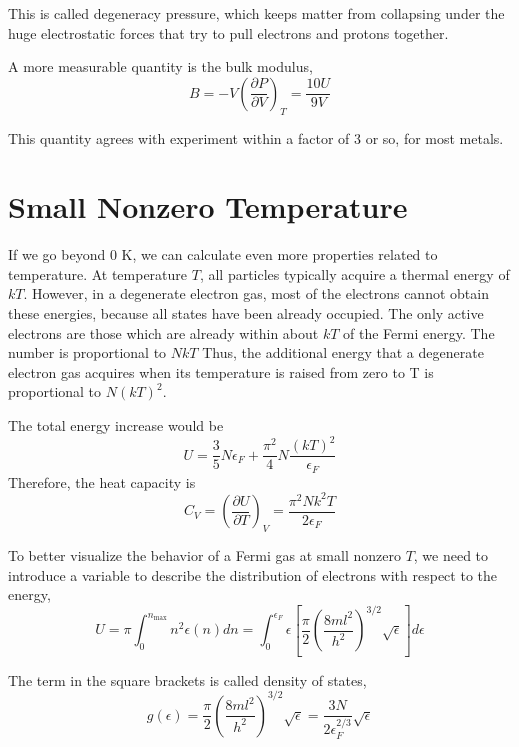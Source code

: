 This is called degeneracy pressure, which keeps matter from collapsing under the huge electrostatic forces that try to pull electrons and protons together.

A more measurable quantity is the bulk modulus,
\begin{equation}
B = -V (\frac{\partial P}{\partial V})_T = \frac{10U}{9V} 
\end{equation}

This quantity agrees with experiment within a factor of 3 or so, for most metals.

\section{Small Nonzero Temperature}
If we go beyond 0 K, we can calculate even more properties related to temperature. At temperature $T$, all particles typically acquire a thermal energy of $kT$.
However, in a degenerate electron gas, most of the electrons cannot obtain these energies, because all states have been already occupied. 
The only active electrons are those which are already within about $kT$ of the Fermi energy. The number is proportional to $NkT$
Thus, the additional energy that a degenerate electron gas acquires when its temperature is raised from zero to T is proportional to $N(kT)^2$.

The total energy increase would be 
\begin{equation}
 U = \frac{3}{5} N \epsilon_{F} + \frac{\pi^2}{4} N \frac{(kT)^2}{\epsilon_{F}}
\end{equation}
Therefore, the heat capacity is
\begin{equation}
C_V = (\frac{\partial U}{\partial T})_V = \frac{\pi^2Nk^2T}{2\epsilon_F}
\end{equation}

To better visualize the behavior of a Fermi gas at small nonzero $T$, we need to introduce a variable to describe the distribution of electrons with respect to the energy,
\begin{equation}
U = \pi \int_0^{n_\textrm{max}} n^2 \epsilon(n) dn 
  = \int _0 ^{\epsilon_F} \epsilon[\frac{\pi}{2} (\frac{8ml^2}{h^2}) ^{3/2} \sqrt{\epsilon}] d\epsilon
\end{equation}

The term in the square brackets is called density of states,
\begin{equation}
g(\epsilon) = \frac{\pi}{2} (\frac{8ml^2}{h^2}) ^{3/2} \sqrt{\epsilon} = \frac{3N}{2\epsilon_F^{2/3}} \sqrt{\epsilon}
\end{equation}

